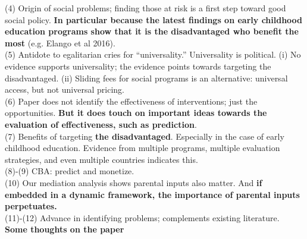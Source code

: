 \noindent (4) Origin of social problems; finding those at risk is a first step toward good social policy. \textbf{In particular because the latest findings on early childhood education programs show that it is the disadvantaged who benefit the most} (e.g. Elango et al 2016).\\

\noindent (5) Antidote to egalitarian cries for ``universality.'' Universality is political. (i) No evidence supports universality; the evidence points towards targeting the disadvantaged. (ii) Sliding fees for social programs is an alternative: universal access, but not universal pricing.\\

\noindent (6) Paper does not identify the effectiveness of interventions; just the opportunities. \textbf{But it does touch on important ideas towards the evaluation of effectiveness, such as prediction}.\\

\noindent (7) Benefits of targeting \textbf{the disadvantaged}. Especially in the case of early childhood education. Evidence from multiple programs, multiple evaluation strategies, and even multiple countries indicates this.\\ 

\noindent (8)-(9) CBA: predict and monetize.\\

\noindent (10) Our mediation analysis shows parental inputs also matter. And \textbf{if embedded in a dynamic framework, the importance of parental inputs perpetuates.}\\

\noindent (11)-(12) Advance in identifying problems; complements existing literature.\\

\noindent \textbf{Some thoughts on the paper}


